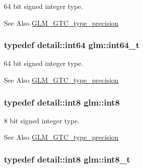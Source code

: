 64 bit signed integer type. 

\begin{DoxySeeAlso}{See Also}
\hyperlink{group__gtc__type__precision}{G\-L\-M\-\_\-\-G\-T\-C\-\_\-type\-\_\-precision} 
\end{DoxySeeAlso}
\hypertarget{group__gtc__type__precision_ga6abb23fbf4e39c50ec5341160b5da5ab}{
\subsubsection[{int64\-\_\-t}]{\setlength{\rightskip}{0pt plus 5cm}typedef detail\-::int64 {\bf glm\-::int64\-\_\-t}}}\label{group__gtc__type__precision_ga6abb23fbf4e39c50ec5341160b5da5ab}


64 bit signed integer type. 

\begin{DoxySeeAlso}{See Also}
\hyperlink{group__gtc__type__precision}{G\-L\-M\-\_\-\-G\-T\-C\-\_\-type\-\_\-precision} 
\end{DoxySeeAlso}
\hypertarget{group__gtc__type__precision_ga96254f9c1c4506fc8eb5cf3301ce8565}{
\subsubsection[{int8}]{\setlength{\rightskip}{0pt plus 5cm}typedef detail\-::int8 {\bf glm\-::int8}}}\label{group__gtc__type__precision_ga96254f9c1c4506fc8eb5cf3301ce8565}


8 bit signed integer type. 

\begin{DoxySeeAlso}{See Also}
\hyperlink{group__gtc__type__precision}{G\-L\-M\-\_\-\-G\-T\-C\-\_\-type\-\_\-precision} 
\end{DoxySeeAlso}
\hypertarget{group__gtc__type__precision_ga673898d450b2a91186f3c4f40c5f8633}{
\subsubsection[{int8\-\_\-t}]{\setlength{\rightskip}{0pt plus 5cm}typedef detail\-::int8 {\bf glm\-::int8\-\_\-t}}}\label{group__gtc__type__precision_ga673898d450b2a91186f3c4f40c5f8633}


